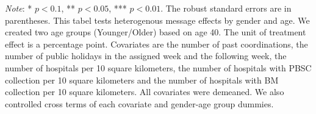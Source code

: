 \documentclass[12pt, a4paper]{article}
\begin{document}
\begin{table}[H]
\begin{threeparttable}
\begin{tablenotes}
\item \emph{Note}: * $p < 0.1$, ** $p < 0.05$, *** $p < 0.01$. The robust standard errors are in parentheses. This tabel tests heterogenous message effects by gender and age. We created two age groups (Younger/Older) based on age 40. The unit of treatment effect is a percentage point. Covariates are the number of past coordinations, the number of public holidays in the assigned week and the following week, the number of hospitals per 10 square kilometers, the number of hospitals with PBSC collection per 10 square kilometers and the number of hospitals with BM collection per 10 square kilometers. All covariates were demeaned. We also controlled cross terms of each covariate and gender-age group dummies.
\end{tablenotes}
\end{threeparttable}
\end{table}
\end{document}
